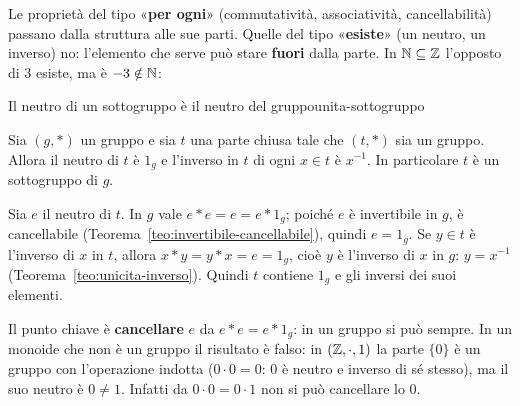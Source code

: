 \begin{spiegazione}
    Le proprietà del tipo «\textbf{per ogni}» (commutatività, associatività, cancellabilità) passano dalla struttura alle sue parti. Quelle del tipo
    «\textbf{esiste}» (un neutro, un inverso) no: l'elemento che serve può stare \textbf{fuori} dalla parte. In $\mathbb{N} \subseteq \mathbb{Z}$ l'opposto di $3$ esiste, ma è $-3 \notin \mathbb{N}$:
    \begin{center}
    \end{center}
\end{spiegazione}

\begin{concetto}
\begin{Proposizione}{Il neutro di un sottogruppo è il neutro del gruppo}{unita-sottogruppo}
    \begin{prerequisiti}
    \end{prerequisiti}
    Sia $(g, *)$ un gruppo e sia $t$ una parte chiusa tale che $(t, *)$ sia un gruppo. Allora il neutro di $t$ è $1_g$ e l'inverso in $t$ di ogni $x \in t$ è $x^{-1}$.
    In particolare $t$ è un sottogruppo di $g$.
\end{Proposizione}
\begin{dimostrazione}
    Sia $e$ il neutro di $t$. In $g$ vale $e * e = e = e * 1_g$; poiché $e$ è invertibile in $g$, è cancellabile (Teorema~\ref{teo:invertibile-cancellabile}), quindi $e = 1_g$.
    Se $y \in t$ è l'inverso di $x$ in $t$, allora $x * y = y * x = e = 1_g$, cioè $y$ è l'inverso di $x$ in $g$: $y = x^{-1}$ (Teorema~\ref{teo:unicita-inverso}). Quindi $t$ contiene
    $1_g$ e gli inversi dei suoi elementi.
\end{dimostrazione}
\end{concetto}

\begin{spiegazione}
    Il punto chiave è \textbf{cancellare} $e$ da $e * e = e * 1_g$: in un gruppo si può sempre. In un monoide che non è un gruppo il risultato è falso:
    in $(\mathbb{Z}, \cdot, 1)$ la parte $\{0\}$ è un gruppo con l'operazione indotta ($0 \cdot 0 = 0$: $0$ è neutro e inverso di sé stesso), ma il suo neutro è $0 \neq 1$.
    Infatti da $0 \cdot 0 = 0 \cdot 1$ non si può cancellare lo $0$.
\end{spiegazione}

